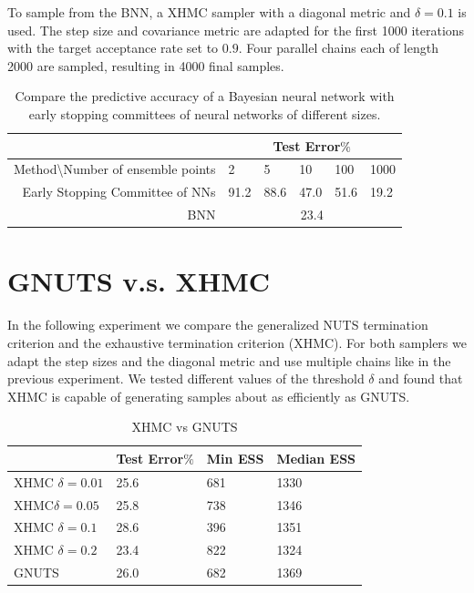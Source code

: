 \documentclass[12pt]{report}
\begin{document}
To sample from the BNN, a XHMC sampler with a diagonal metric and $\delta = 0.1$ is used. The step size and covariance metric are adapted for the first 1000 iterations with the target acceptance rate set to $0.9$. Four parallel chains each of length 2000 are sampled, resulting in 4000 final samples.
\begin{table}[]
\centering
\begin{tabular}{@{}rlllll@{}}
\multicolumn{1}{l}{}                            & \multicolumn{5}{c}{Test Error$\%$} \\ \midrule
Method\textbackslash{}Number of ensemble points & 2    & 5   & 10  & 100 & 1000 \\ \midrule
Early Stopping Committee of NNs                 & 91.2  & 88.6 & 47.0 & 51.6 & 19.2  \\ \midrule
BNN                                             & \multicolumn{5}{c}{23.4}        \\ \bottomrule
\end{tabular}
\caption{Compare the predictive accuracy of a Bayesian neural network with early stopping committees of neural networks of different sizes.}
\label{esc}
\end{table}

\section{GNUTS v.s. XHMC}
In the following experiment we compare the generalized NUTS termination criterion and the exhaustive termination criterion (XHMC). For both samplers we adapt the step sizes and the diagonal metric and use multiple chains like in the previous experiment. We tested different values of the threshold $\delta$ and found that XHMC is capable of generating samples about as efficiently as GNUTS. 

\begin{table}[]
\centering
\begin{tabular}{@{}llll@{}}
\toprule
          & Test Error$\%$ & Min ESS & Median ESS \\ \midrule
XHMC $\delta=0.01$  & 25.6       & 681     & 1330       \\ \midrule
XHMC$\delta=0.05$  & 25.8       & 738     & 1346       \\ \midrule
XHMC $\delta=0.1$ & 28.6       & 396     & 1351       \\ \midrule
XHMC $\delta=0.2$ & 23.4       & 822    & 1324        \\ \midrule
GNUTS     & 26.0       & 682     & 1369       \\ \bottomrule
\end{tabular}
\caption{XHMC vs GNUTS}
\label{my-label}
\end{table}
\end{document}
